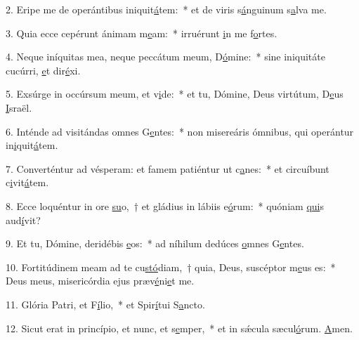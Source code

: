 2. Eripe me de operántibus iniquit\uline{á}tem:~* et de viris s\uline{á}nguinum s\uline{a}lva me.\par 
3. Quia ecce cepérunt ánimam m\uline{e}am:~* irruérunt \uline{i}n me f\uline{o}rtes.\par 
4. Neque iníquitas mea, neque peccátum meum, D\uline{ó}mine:~* sine iniquitáte cucúrri, \uline{e}t dir\uline{é}xi.\par 
5. Exsúrge in occúrsum meum, et v\uline{i}de:~* et tu, Dómine, Deus virtútum, D\uline{e}us \uline{I}sraël.\par 
6. Inténde ad visitándas omnes G\uline{e}ntes:~* non misereáris ómnibus, qui operántur in\uline{i}quit\uline{á}tem.\par 
7. Converténtur ad vésperam: et famem patiéntur ut c\uline{a}nes:~* et circuíbunt c\uline{i}vit\uline{á}tem.\par 
8. Ecce loquéntur in ore \uline{su}o,~† et gládius in lábiis e\uline{ó}rum:~* quóniam \uline{qui}s aud\uline{í}vit?\par 
9. Et tu, Dómine, deridébis \uline{e}os:~* ad níhilum dedúces \uline{o}mnes G\uline{e}ntes.\par 
10. Fortitúdinem meam ad te cu\uline{stó}diam,~† quia, Deus, suscéptor m\uline{e}us es:~* Deus meus, misericórdia ejus præv\uline{é}ni\uline{e}t me.\par 
11. Glória Patri, et F\uline{í}lio,~* et Spir\uline{í}tui S\uline{a}ncto.\par 
12. Sicut erat in princípio, et nunc, et s\uline{e}mper,~* et in sǽcula sæcul\uline{ó}rum. \uline{A}men.\par 
